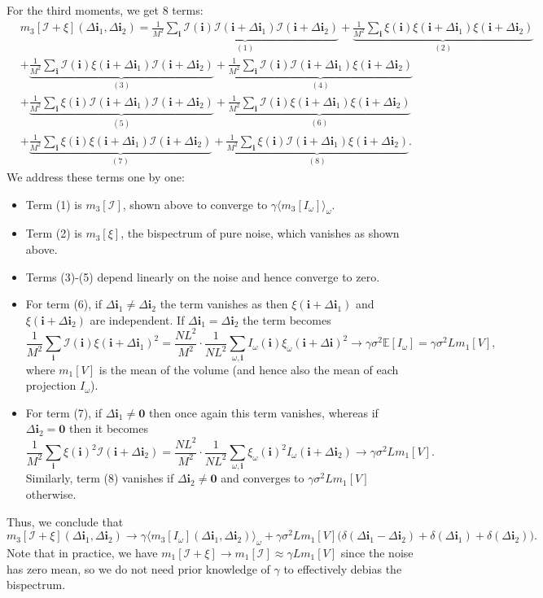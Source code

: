 \documentclass[english,11pt]{article}
\newcommand{\1}{\mathbf{1}}
\newcommand{\II}{\mathcal{I}}
\newcommand{\mb}{\mathbf}
\numberwithin{equation}{section}
\theoremstyle{plain}
\theoremstyle{definition}
\theoremstyle{remark}
\theoremstyle{plain}
\theoremstyle{remark}
\theoremstyle{plain}
\theoremstyle{plain}
\begin{document}
For the third moments, we get 8 terms:
\[\begin{aligned} 
&m_3[\II+\xi](\Delta\mb i_1, \Delta\mb i_2) =
\underbrace{\frac{1}{M^2}\sum_{\mb i}\II(\mb i)\II(\mb i+\Delta\mb
	i_1)\II(\mb i + \Delta\mb i_2)}_{(1)} +
\underbrace{\frac{1}{M^2}\sum_{\mb i}\xi(\mb i)\xi(\mb i+\Delta\mb i_1)\xi(\mb i + \Delta\mb i_2)}_{(2)}\\ 
&+ \underbrace{\frac{1}{M^2}\sum_{\mb i}\II(\mb i)\xi(\mb i + \Delta\mb i_1)\II(\mb i + \Delta\mb i_2)}_{(3)} +
\underbrace{\frac{1}{M^2}\sum_{\mb i}\II(\mb i)\II(\mb i + \Delta\mb i_1)\xi(\mb i + \Delta\mb i_2)}_{(4)}\\
&+ \underbrace{\frac{1}{M^2}\sum_{\mb i}\xi(\mb i)\II(\mb i + \Delta\mb i_1)\II(\mb i + \Delta\mb i_2)}_{(5)} +
\underbrace{\frac{1}{M^2}\sum_{\mb i}\II(\mb i)\xi(\mb i + \Delta\mb i_1)\xi(\mb i + \Delta\mb i_2)}_{(6)}\\
&+ \underbrace{\frac{1}{M^2}\sum_{\mb i}\xi(\mb i)\xi(\mb i + \Delta\mb i_1)\II(\mb i + \Delta\mb i_2)}_{(7)} +
\underbrace{\frac{1}{M^2}\sum_{\mb i}\xi(\mb i)\II(\mb i + \Delta\mb i_1)\xi(\mb i + \Delta\mb i_2)}_{(8)}.
\end{aligned}\]
We address these terms one by one:
\begin{itemize}
	\item Term (1) is $m_3[\II]$, shown above to converge to
	$\gamma\langle m_3[I_{\omega}]\rangle_{\omega}$.
	\item Term (2) is $m_3[\xi]$, the bispectrum of pure noise, which
	vanishes as shown above.
	\item Terms (3)-(5) depend linearly on the noise and hence
	converge to zero.
	\item For term (6), if $\Delta\mb i_1\neq \Delta\mb i_2$ the term
	vanishes as then $\xi(\mb i + \Delta\mb i_1)$ and $\xi(\mb i +
	\Delta\mb i_2)$ are independent. If $\Delta\mb i_1 = \Delta\mb
	i_2$ the term becomes
	\[ \frac{1}{M^2}\sum_{\mb i}\II(\mb i)\xi(\mb i + \Delta\mb i_1)^2
	= \frac{NL^2}{M^2}\cdot\frac{1}{NL^2}\sum_{\omega, \mb
		i}I_{\omega}(\mb i)\xi_{\omega}(\mb i + \Delta\mb i)^2 \to
	\gamma\sigma^2\mathbb{E}[I_{\omega}] =
	\gamma\sigma^2Lm_1[V],\]
	where $m_1[V]$ is the mean of the volume (and hence also the
	mean of each projection $I_{\omega}$).
	\item For term (7), if $\Delta\mb i_1 \neq \mb 0$ then once again
	this term vanishes, whereas if $\Delta\mb i_2 = \mb 0$ then it becomes
	\[ \frac{1}{M^2}\sum_{\mb i}\xi(\mb i)^2\II(\mb i + \Delta\mb
	i_2) = \frac{NL^2}{M^2}\cdot\frac{1}{NL^2}\sum_{\omega,\mb
		i}\xi_{\omega}(\mb i)^2I_{\omega}(\mb i + \Delta\mb i_2) \to
	\gamma\sigma^2Lm_1[V].\]
	Similarly, term (8) vanishes if $\Delta\mb i_2\neq \mb 0$ and
	converges to $\gamma\sigma^2Lm_1[V]$ otherwise.
\end{itemize}
Thus, we conclude that
\[ m_3[\II+\xi](\Delta\mb i_1, \Delta\mb i_2) \to \gamma\langle
m_3[I_{\omega}](\Delta\mb i_1, \Delta\mb i_2)\rangle_{\omega} +
\gamma\sigma^2Lm_1[V]\Big(\delta(\Delta\mb i_1 - \Delta\mb i_2) +
\delta(\Delta\mb i_1) + \delta(\Delta\mb i_2)\Big).\]
Note that in practice, we have $m_1[\II+\xi] \to m_1[\II] \approx \gamma
Lm_1[V]$ since the noise has zero mean, so we do not need prior knowledge of $\gamma$ to effectively
debias the bispectrum.
\end{document}

